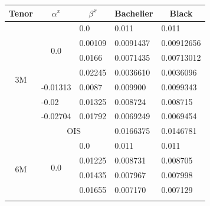\documentclass[12pt]{article}
\begin{document}
\begin{table}[H]
    \centering
    \begin{tabular}{|c||c||c||c|c|} \hline
    Tenor               & $\alpha^x$          & $\beta^x$                     &  Bachelier    & Black \\ \hline \hline
    \multirow{8}{*}{3M} & \multirow{4}{*}{0.0}  & \multicolumn{1}{l||}{0.0} & \multicolumn{1}{l|}{0.011} & \multicolumn{1}{l|}{ 0.011} \\\cline{3-5}
                        &                          & \multicolumn{1}{l||}{0.00109} & \multicolumn{1}{l|}{0.0091437} & \multicolumn{1}{l|}{0.00912656} \\\cline{3-5}
                        &                          & \multicolumn{1}{l||}{0.0166} & \multicolumn{1}{l|}{0.0071435} & \multicolumn{1}{l|}{0.00713012} \\\cline{3-5}
                        &                          & \multicolumn{1}{l||}{0.02245} & \multicolumn{1}{l|}{0.0036610} & \multicolumn{1}{l|}{0.0036096} \\\cline{2-5}
                        & \multicolumn{1}{l||}{-0.01313} & \multicolumn{1}{l||}{0.0087} & \multicolumn{1}{l|}{ 0.009900} & \multicolumn{1}{l|}{0.0099343} \\\cline{2-5}
                        & \multicolumn{1}{l||}{-0.02} & \multicolumn{1}{l||}{0.01325} & \multicolumn{1}{l|}{0.008724} & \multicolumn{1}{l|}{0.008715} \\\cline{2-5}
                        & \multicolumn{1}{l||}{-0.02704} & \multicolumn{1}{l||}{0.01792} & \multicolumn{1}{l|}{0.0069249} & \multicolumn{1}{l|}{0.0069454} \\\cline{2-5}
                        &  \multicolumn{2}{|c||}{OIS}                          &  \multicolumn{1}{l|}{0.0166375} & \multicolumn{1}{l|}{0.0146781} \\ \hline \hline
    \multirow{8}{*}{6M}& \multirow{4}{*}{0.0} & \multicolumn{1}{l||}{0.0} & \multicolumn{1}{l|}{0.011} & \multicolumn{1}{l|}{0.011} \\\cline{3-5}
                        &                          & \multicolumn{1}{l||}{0.01225} & \multicolumn{1}{l|}{0.008731} & \multicolumn{1}{l|}{0.008705} \\\cline{3-5}
                        &                          & \multicolumn{1}{l||}{0.01435} & \multicolumn{1}{l|}{0.007967} & \multicolumn{1}{l|}{0.007998} \\\cline{3-5}
                        &                          & \multicolumn{1}{l||}{0.01655} & \multicolumn{1}{l|}{0.007170} & \multicolumn{1}{l|}{0.007129} \\\cline{2-5}

\end{tabular}
\end{table}
\end{document}

